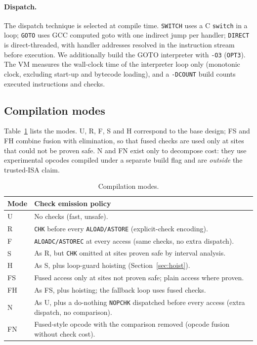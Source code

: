 \documentclass[11pt,a4paper]{article}
\begin{document}
\paragraph{Dispatch.} The dispatch technique is selected at compile time. \texttt{SWITCH} uses a C \texttt{switch} in a loop; \texttt{GOTO} uses GCC computed goto with one indirect jump per handler; \texttt{DIRECT} is direct-threaded, with handler addresses resolved in the instruction stream before execution. We additionally build the GOTO interpreter with \texttt{-O3} (\texttt{OPT3}). The VM measures the wall-clock time of the interpreter loop only (monotonic clock, excluding start-up and bytecode loading), and a \texttt{-DCOUNT} build counts executed instructions and checks.

\subsection{Compilation modes}
Table~\ref{tab:modes} lists the modes. U, R, F, S and H correspond to the base design; FS and FH combine fusion with elimination, so that fused checks are used only at sites that could not be proven safe. N and FN exist only to decompose cost: they use experimental opcodes compiled under a separate build flag and are \emph{outside} the trusted-ISA claim.

\begin{table}[t]
\centering
\caption{Compilation modes.}\label{tab:modes}
\small
\begin{tabular}{@{}lp{11.5cm}@{}}
\toprule
Mode & Check emission policy \\
\midrule
U & No checks (fast, unsafe). \\
R & \texttt{CHK} before every \texttt{ALOAD/ASTORE} (explicit-check encoding). \\
F & \texttt{ALOADC/ASTOREC} at every access (same checks, no extra dispatch). \\
S & As R, but \texttt{CHK} omitted at sites proven safe by interval analysis. \\
H & As S, plus loop-guard hoisting (Section~\ref{sec:hoist}). \\
FS & Fused access only at sites not proven safe; plain access where proven. \\
FH & As FS, plus hoisting; the fallback loop uses fused checks. \\
N & As U, plus a do-nothing \texttt{NOPCHK} dispatched before every access (extra dispatch, no comparison). \\
FN & Fused-style opcode with the comparison removed (opcode fusion without check cost). \\
\bottomrule
\end{tabular}
\end{table}
\end{document}
